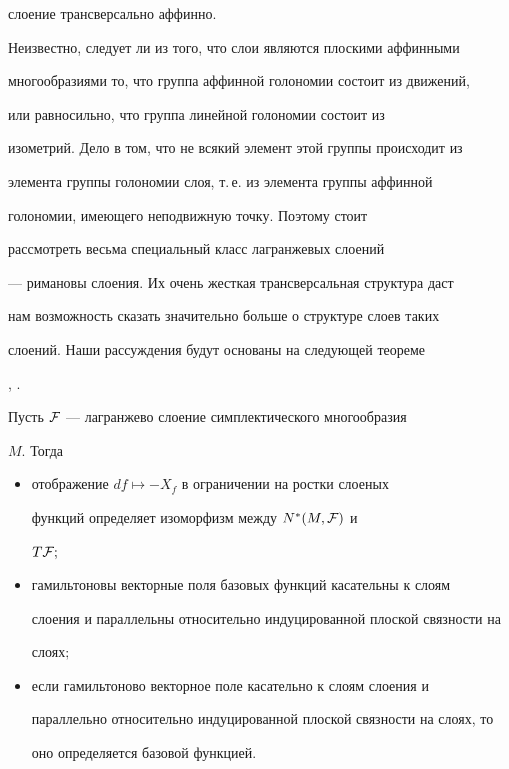 слоение трансверсально аффинно.


Неизвестно, следует ли из того, что слои являются плоскими аффинными


многообразиями то, что группа аффинной голономии состоит из движений,


или равносильно, что группа линейной голономии состоит из


изометрий. Дело в том, что не всякий элемент этой группы происходит из


элемента группы голономии слоя, т.\,е. из элемента группы аффинной


голономии, имеющего неподвижную точку. Поэтому стоит


рассмотреть весьма специальный класс лагранжевых слоений


--- римановы слоения. Их очень жесткая трансверсальная структура даст


нам возможность сказать значительно больше о структуре слоев таких


слоений. Наши рассуждения будут основаны на следующей теореме


\cite{WE}, \cite{VAbar}.





\begin{thm}


Пусть $\cal F$ --- лагранжево слоение симплектического многообразия


$M$. Тогда


\begin{itemize}


\item[(i)] отображение $df \mapsto -X_f$ в ограничении на ростки слоеных


функций определяет изоморфизм между $N^{\ast}(M, {\cal F})$ и


$T{\cal F};$


\item[(ii)] гамильтоновы векторные поля базовых функций касательны к слоям


слоения и параллельны относительно индуцированной плоской связности на


слоях$;$


\item[(iii)] если гамильтоново векторное поле касательно к слоям слоения и


параллельно относительно индуцированной плоской связности на слоях, то


оно определяется базовой функцией.


\end{itemize}


\end{thm}





